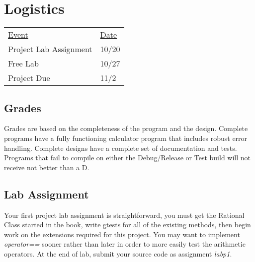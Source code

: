 \documentclass[10pt]{article}
\begin{document}
\section*{Logistics}

\begin{center}
\begin{tabular}{ll}
  \underline{Event} & \underline{Date} \\
    Project Lab Assignment & 10/20 \\
    Free Lab & 10/27 \\
    Project Due & 11/2
\end{tabular}
\end{center}

\subsection*{Grades}

Grades are based on the completeness of the program and the design. Complete programs have a fully functioning calculator program that includes robust error handling. Complete designs have a complete set of documentation and tests. Programs that fail to compile on either the Debug/Release or Test build will not receive not better than a D. 

\subsection*{Lab Assignment}

Your first project lab assignment is straightforward, you must get the Rational Class started in the book, write gtests for all of the existing methods, then begin work on the extensions required for this project. You may want to implement \textit{operator==} sooner rather than later in order to more easily test the arithmetic operators. At the end of lab, submit your source code as assignment \textit{labp1}.
\end{document}
